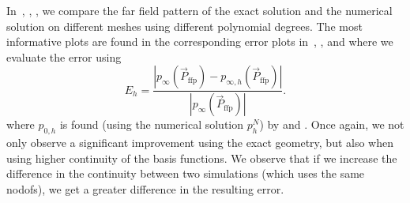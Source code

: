 \begin{figure}
	\label{Fig2:SphericalShellMesh34_p_FSI}
\end{figure}

In~, , ,  we compare the far field pattern of the exact solution and the numerical solution on different meshes using different polynomial degrees. The most informative plots are found in the corresponding error plots in~, ,  and  where we evaluate the error using
\begin{equation}\label{Eq2:relError}
	E_h = \frac{\left|p_\infty(\vec{P}_{\mathrm{ffp}})-p_{\infty,h}(\vec{P}_{\mathrm{ffp}})\right|}{\left|p_\infty(\vec{P}_{\mathrm{ffp}})\right|}.
\end{equation}
where $p_{0,h}$ is found (using the numerical solution $p_h^N$) by  and . Once again, we not only observe a significant improvement using the exact geometry, but also when using higher continuity of the basis functions. We observe that if we increase the difference in the continuity between two simulations (which uses the same nodofs), we get a greater difference in the resulting error.

